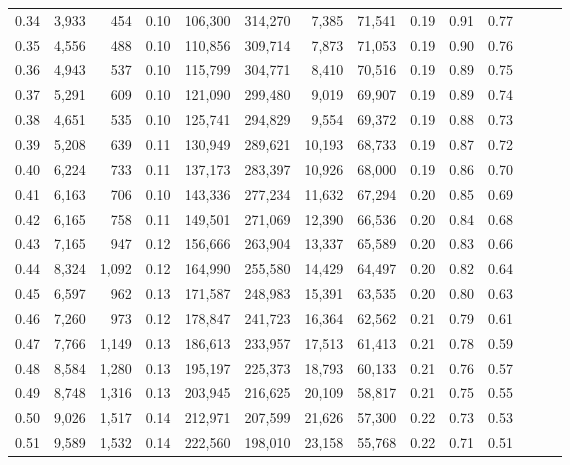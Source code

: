 \begin{tabular}{rrrrrrrrrrrrrr}
0.34 &   3,933 &    454 &  0.10 &  106,300 &  314,270 &   7,385 &  71,541 &  0.19 &  0.91 &      0.77 \\
0.35 &   4,556 &    488 &  0.10 &  110,856 &  309,714 &   7,873 &  71,053 &  0.19 &  0.90 &      0.76 \\
0.36 &   4,943 &    537 &  0.10 &  115,799 &  304,771 &   8,410 &  70,516 &  0.19 &  0.89 &      0.75 \\
0.37 &   5,291 &    609 &  0.10 &  121,090 &  299,480 &   9,019 &  69,907 &  0.19 &  0.89 &      0.74 \\
0.38 &   4,651 &    535 &  0.10 &  125,741 &  294,829 &   9,554 &  69,372 &  0.19 &  0.88 &      0.73 \\
0.39 &   5,208 &    639 &  0.11 &  130,949 &  289,621 &  10,193 &  68,733 &  0.19 &  0.87 &      0.72 \\
0.40 &   6,224 &    733 &  0.11 &  137,173 &  283,397 &  10,926 &  68,000 &  0.19 &  0.86 &      0.70 \\
0.41 &   6,163 &    706 &  0.10 &  143,336 &  277,234 &  11,632 &  67,294 &  0.20 &  0.85 &      0.69 \\
0.42 &   6,165 &    758 &  0.11 &  149,501 &  271,069 &  12,390 &  66,536 &  0.20 &  0.84 &      0.68 \\
0.43 &   7,165 &    947 &  0.12 &  156,666 &  263,904 &  13,337 &  65,589 &  0.20 &  0.83 &      0.66 \\
0.44 &   8,324 &  1,092 &  0.12 &  164,990 &  255,580 &  14,429 &  64,497 &  0.20 &  0.82 &      0.64 \\
0.45 &   6,597 &    962 &  0.13 &  171,587 &  248,983 &  15,391 &  63,535 &  0.20 &  0.80 &      0.63 \\
0.46 &   7,260 &    973 &  0.12 &  178,847 &  241,723 &  16,364 &  62,562 &  0.21 &  0.79 &      0.61 \\
0.47 &   7,766 &  1,149 &  0.13 &  186,613 &  233,957 &  17,513 &  61,413 &  0.21 &  0.78 &      0.59 \\
0.48 &   8,584 &  1,280 &  0.13 &  195,197 &  225,373 &  18,793 &  60,133 &  0.21 &  0.76 &      0.57 \\
0.49 &   8,748 &  1,316 &  0.13 &  203,945 &  216,625 &  20,109 &  58,817 &  0.21 &  0.75 &      0.55 \\
0.50 &   9,026 &  1,517 &  0.14 &  212,971 &  207,599 &  21,626 &  57,300 &  0.22 &  0.73 &      0.53 \\
0.51 &   9,589 &  1,532 &  0.14 &  222,560 &  198,010 &  23,158 &  55,768 &  0.22 &  0.71 &      0.51 \\

\end{tabular}
